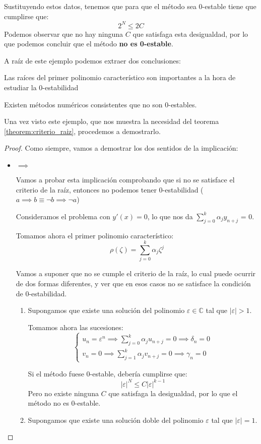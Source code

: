 \begin{example}
Sustituyendo estos datos, tenemos que para que el método sea 0-estable tiene que cumplirse que:
\[2^N \leq 2C\]
Podemos observar que no hay ninguna $C$ que satisfaga esta desigualdad, por lo que podemos concluir que el método \textbf{no es 0-estable}.
\end{example}

A raíz de este ejemplo podemos extraer dos conclusiones:

\obs Las raíces del primer polinomio característico son importantes a la hora de estudiar la 0-estabilidad

\obs Existen métodos numéricos consistentes que no son 0-estables.

Una vez visto este ejemplo, que nos muestra la necesidad del teorema \ref{theorem:criterio_raiz}, procedemos a demostrarlo.
\begin{proof}
Como siempre, vamos a demostrar los dos sentidos de la implicación:
\begin{itemize}
\item $\implies$

Vamos a probar esta implicación comprobando que si no se satisface el criterio de la raíz, entonces no podemos tener 0-estabilidad ($a \implies b \equiv \neg b \implies \neg a$)

Consideramos el problema con $y'(x)=0$, lo que nos da $\sum_{j=0}^kα_jy_{n+j}$ = 0.

Tomamos ahora el primer polinomio característico:
\[ρ(ζ) = \sum_{j=0}^kα_jζ^j\]

Vamos a suponer que no se cumple el criterio de la raíz, lo cual puede ocurrir de dos formas diferentes, y ver que en esos casos no se satisface la condición de 0-estabilidad.
\begin{enumerate}
\item Supongamos que existe una solución del polinomio $ε∈ℂ$ tal que $|ε| >1$.

Tomamos ahora las sucesiones:
\[\left\{ \begin{array}{l}u_n = ε^n \implies \sum_{j=0}^kα_ju_{n+j} = 0 \implies δ_n = 0 \\
v_n = 0 \implies \sum_{j=1}^kα_jv_{n+j}=0 \implies γ_n=0 \end{array}\right.\]

Si el método fuese 0-estable, debería cumplirse que:
\[|ε|^N \leq C |ε|^{k-1}\]
Pero no existe ninguna $C$ que satisfaga la desigualdad, por lo que el método no es 0-estable.

\item Supongamos que existe una solución doble del polinomio $ε$ tal que $|ε|=1$. 


\end{enumerate}
\end{itemize}
\end{proof}
